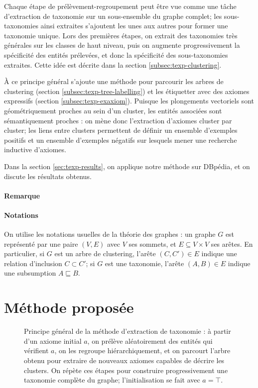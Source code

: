Chaque étape de prélèvement-regroupement peut être vue comme une tâche d'extraction de taxonomie sur un sous-ensemble du graphe complet; les sous-taxonomies ainsi extraites s'ajoutent les unes aux autres pour former une taxonomie unique. Lors des premières étapes, on extrait des taxonomies très générales sur les classes de haut niveau, puis on augmente progressivement la spécificité des entités prélevées, et donc la spécificité des sous-taxonomies extraites. Cette idée est décrite dans la section \ref{subsec:texp-clustering}.

À ce principe général s'ajoute une méthode pour parcourir les arbres de clustering (section \ref{subsec:texp-tree-labelling}) et les étiquetter avec des axiomes expressifs (section \ref{subsec:texp-exaxiom}). Puisque les plongements vectoriels sont géométriquement proches au sein d'un cluster, les entités associées sont sémantiquement proches : on mène donc l'extraction d'axiomes cluster par cluster; les liens entre clusters permettent de définir un ensemble d'exemples positifs et un ensemble d'exemples négatifs sur lesquels mener une recherche inductive d'axiomes.


Dans la section \ref{sec:texp-results}, on applique notre méthode sur DBpédia, et on discute les résultats obtenus.
 

\paragraph{Remarque}


\paragraph{Notations}

On utilise les notations usuelles de la théorie des graphes : un graphe $G$ est représenté par une paire $(V, E)$ avec $V$ ses sommets, et $E \subseteq V \times V$ ses arêtes. En particulier, si $G$ est un arbre de clustering, l'arête $(C, C') \in E$ indique une relation d'inclusion $C \subset C'$; si $G$ est une taxonomie, l'arête $(A, B) \in E$ indique une subsumption $A \sqsubseteq B$. %

\section{Méthode proposée}

\begin{figure}[h]
    \centering
    
    \caption[Aperçu de la méthode d'extraction de taxonomie expressive]{Principe général de la méthode d'extraction de taxonomie : à partir d'un axiome initial $a$, on prélève aléatoirement des entités qui vérifient $a$, on les regroupe hiérarchiquement, et on parcourt l'arbre obtenu pour extraire de nouveaux axiomes capables de décrire les clusters. On répète ces étapes pour construire progressivement une taxonomie complète du graphe; l'initialisation se fait avec $a = \top$.}
    \label{fig:texp-overview}
\end{figure}

